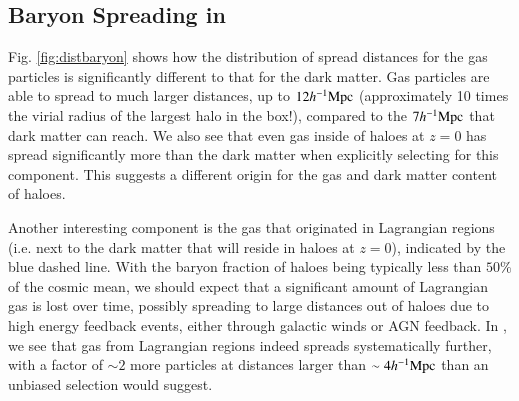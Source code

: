 \subsection{Baryon Spreading in \simba{}}


Fig. \ref{fig:distbaryon} shows how the distribution of spread distances
for the gas particles is significantly different to that for the dark matter.
Gas particles are able to spread to much larger distances, up to $12h^{-1}{\rm Mpc}{}$
(approximately 10 times the virial radius of the largest halo in the box!),
compared to the $7h^{-1}{\rm Mpc}{}$ that dark matter can reach. We also see that even
gas inside of haloes at $z=0$ has spread significantly more than the dark
matter when explicitly selecting for this component. This suggests a
different origin for the gas and dark matter content of haloes.

Another interesting component is the gas that originated in Lagrangian
regions (i.e. next to the dark matter that will reside in haloes at $z=0$),
indicated by the blue dashed line. With the baryon fraction of haloes being
typically less than $50\%$ of the cosmic mean, we should expect that a
significant amount of Lagrangian gas is lost over time, possibly spreading to
large distances out of haloes due to high energy feedback events, either
through galactic winds or AGN feedback. In \simba{}, we see that gas from
Lagrangian regions indeed spreads systematically further, with a factor of
$\sim 2$ more particles at distances larger than $\sim 4 h^{-1}{\rm Mpc}{}$ than an
unbiased selection would suggest.


